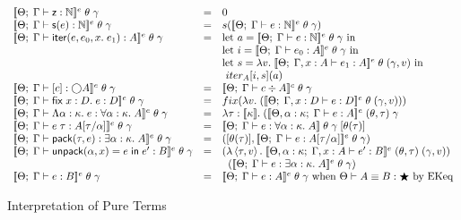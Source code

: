 \begin{figure}
\begin{displaymath}
\begin{array}{lcl}
    \interpE{\judgeE{\Gamma}{\z}{\N}}\;\theta\;\gamma
       & = & 
         0 
    \\
    \interpE{\judgeE{\Gamma}{\s{e}}{\N}}\;\theta\;\gamma
       & = & 
         s (\interpE{\judgeE{\Gamma}{e}{\N}}\;\theta\;\gamma)
    \\
    \interpE{\judgeE{\Gamma}{\iter{e}{e_0}{x}{e_1}}{A}}\;\theta\;\gamma
    &=& 
       \mbox{let } 
          a = \interpE{\judgeE{\Gamma}{e}{\N}}\;\theta\;\gamma  
       \mbox{ in}\\
    & &\mbox{let } 
          i = \interpE{\judgeE{\Gamma}{e_0}{A}}\;\theta\;\gamma
       \mbox{ in}\\
    & &\mbox{let } 
          s = \semfun{v}{\interpE{\judgeE{\Gamma,x:A}{e_1}{A}}\;\theta\;(\gamma,v)}  
       \mbox{ in}\\
    & &\mbox{ }iter_A[i, s](a)
   \\
   \interpE{\judgeE{\Gamma}{\comp{c}}{\monad{A}}}\;\theta\;\gamma
   & = & 
     \interpC{\judgeC{\Gamma}{c}{A}}\;\theta\;\gamma
   \\
   \interpE{\judgeE{\Gamma}{\fix{x:D}{e}}{D}}\;\theta\;\gamma
   & = & 
     fix(\semfun{v}{(\interpE{\judgeE{\Gamma, x:D}{e}{D}}\;\theta\;(\gamma,v))})
   \\
   \interpE{\judgeE{\Gamma}{\Fun{\alpha}{\kappa}{e}}
                           {\forall \alpha:\kappa.\; A}}\;\theta\;\gamma 
   & = & 
     \lambda \tau:\interp{\kappa}.\; 
        (\interpE{\judgeE[\Theta, \alpha:\kappa]{\Gamma}{e}{A}}\;(\theta, \tau)\;\gamma
   \\
   \interpE{\judgeE{\Gamma}{e\;\tau}{A[\tau/\alpha]}}\;\theta\;\gamma
   & = & 
     \interp{\judgeE{\Gamma}{e}{\forall \alpha:\kappa.\;A}}\;\theta\;\gamma\;
            [\theta(\tau)]
   \\
   \interpE{\judgeE{\Gamma}{\pack{\tau}{e}}{\exists \alpha:\kappa.\;A}}
           \;\theta\;\gamma
   & = & 
     ([\theta(\tau)], \interpE{\judgeE{\Gamma}{e}{A[\tau/\alpha]}}\;\theta\;\gamma)
   \\
   \interpE{\judgeE{\Gamma}{\unpack{\alpha}{x}{e}{e'}}{B}}\;\theta\;\gamma
   & = & 
   (\semfun{\pair{\tau}{v}}
           {\interpE{\judgeE[\Theta, \alpha:\kappa]{\Gamma, x:A}{e'}{B}}
                    \;(\theta, \tau)\;(\gamma,v)})
   \\
   & & \;\;
   (\interpE{\judgeE{\Gamma}{e}{\exists \alpha:\kappa.\;A}}\;\theta\;\gamma)
   \\
   \interpE{\judgeE{\Gamma}{e}{B}}\;\theta\;\gamma 
   & = & 
     \interpE{\judgeE{\Gamma}{e}{A}}\;\theta\;\gamma \mbox{ when } \judgeKeq{A}{B}{\bigstar}
     \mbox{ by EKeq}
   \\
  \end{array}
\end{displaymath}
\caption{Interpretation of Pure Terms}
\label{lang-pure-interp}
\end{figure}


